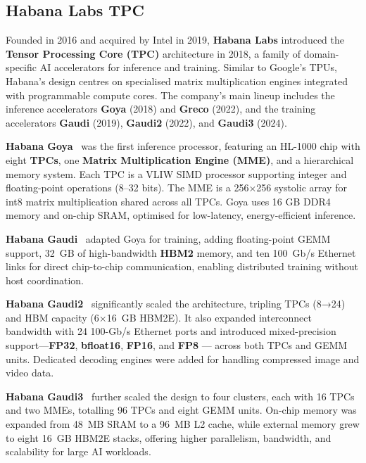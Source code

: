 \subsection{Habana Labs TPC}
\label{chap:background:sec:habana}

Founded in 2016 and acquired by Intel in 2019, \textbf{Habana Labs} introduced the \textbf{Tensor Processing Core (TPC)} architecture in 2018, a family of domain-specific AI accelerators for inference and training. Similar to Google’s TPUs, Habana’s design centres on specialised matrix multiplication engines integrated with programmable compute cores. The company’s main lineup includes the inference accelerators \textbf{Goya} (2018) and \textbf{Greco} (2022), and the training accelerators \textbf{Gaudi} (2019), \textbf{Gaudi2} (2022), and \textbf{Gaudi3} (2024).

\textbf{Habana Goya}~\cite{Gwennap2019} was the first inference processor, featuring an HL-1000 chip with eight \textbf{TPCs}, one \textbf{Matrix Multiplication Engine (MME)}, and a hierarchical memory system. Each TPC is a VLIW SIMD processor supporting integer and floating-point operations (8–32 bits). The MME is a 256×256 systolic array for int8 matrix multiplication shared across all TPCs. Goya uses 16 GB DDR4 memory and on-chip SRAM, optimised for low-latency, energy-efficient inference.

\textbf{Habana Gaudi}~\cite{Gwennap2019} adapted Goya for training, adding floating-point GEMM support, 32~GB of high-bandwidth \textbf{HBM2} memory, and ten 100~Gb/s Ethernet links for direct chip-to-chip communication, enabling distributed training without host coordination.

\textbf{Habana Gaudi2}~\cite{gaudi2} significantly scaled the architecture, tripling TPCs (8→24) and HBM capacity (6×16~GB HBM2E). It also expanded interconnect bandwidth with 24 100-Gb/s Ethernet ports and introduced mixed-precision support—\textbf{FP32}, \textbf{bfloat16}, \textbf{FP16}, and \textbf{FP8} — across both TPCs and GEMM units. Dedicated decoding engines were added for handling compressed image and video data.

\textbf{Habana Gaudi3}~\cite{Kaplan2024} further scaled the design to four clusters, each with 16 TPCs and two MMEs, totalling 96 TPCs and eight GEMM units. On-chip memory was expanded from 48~MB SRAM to a 96~MB L2 cache, while external memory grew to eight 16~GB HBM2E stacks, offering higher parallelism, bandwidth, and scalability for large AI workloads.

